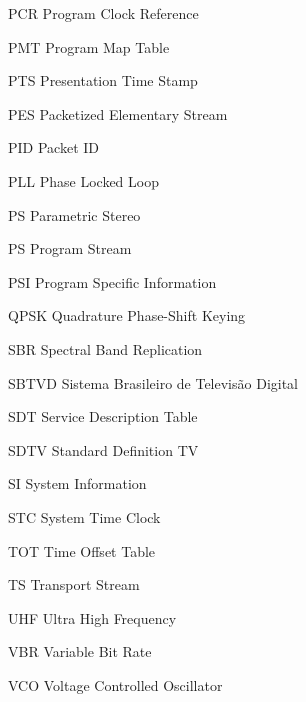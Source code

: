 \begin{siglas}
  \item[PCR] Program Clock Reference
  \item[PMT] Program Map Table
  \item[PTS] Presentation Time Stamp
  \item[PES] Packetized Elementary Stream
  \item[PID] Packet ID
  \item[PLL] Phase Locked Loop
  \item[PS] Parametric Stereo
  \item[PS] Program Stream
  \item[PSI] Program Specific Information
  \item[QPSK] Quadrature Phase-Shift Keying
  \item[SBR] Spectral Band Replication
  \item[SBTVD] Sistema Brasileiro de Televisão Digital
  \item[SDT] Service Description Table
  \item[SDTV] Standard Definition TV
  \item[SI] System Information
  \item[STC] System Time Clock
  \item[TOT] Time Offset Table
  \item[TS] Transport Stream
  \item[UHF] Ultra High Frequency
  \item[VBR] Variable Bit Rate
  \item[VCO] Voltage Controlled Oscillator
  \item[]
  \item[]
  \item[]
  
  
\end{siglas}
